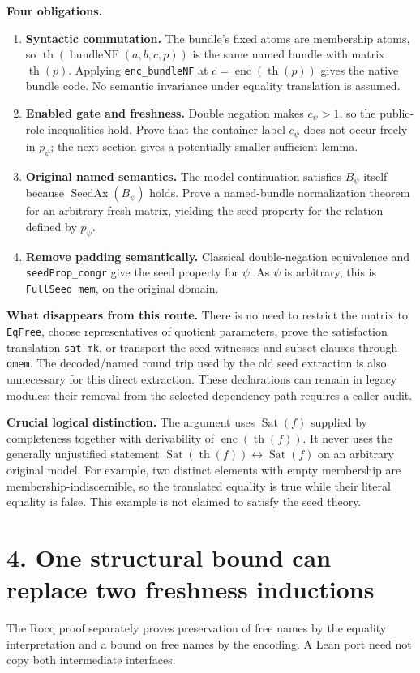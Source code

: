 \documentclass[10pt]{article}
\newcommand{\code}[1]{\texttt{#1}}
\begin{document}
\textbf{Four obligations.}
\begin{enumerate}
\item \textbf{Syntactic commutation.} The bundle's fixed atoms are membership atoms, so
$\operatorname{th}(\operatorname{bundleNF}(a,b,c,p))$
is the same named bundle with matrix $\operatorname{th}(p)$.
Applying \code{enc\_bundleNF} at $c=\operatorname{enc}(\operatorname{th}(p))$ gives the native bundle code. No semantic invariance under equality translation is assumed.
\item \textbf{Enabled gate and freshness.} Double negation makes $c_\psi>1$, so the public-role inequalities hold. Prove that the container label $c_\psi$ does not occur freely in $p_\psi$; the next section gives a potentially smaller sufficient lemma.
\item \textbf{Original named semantics.} The model continuation satisfies $B_\psi$ itself because $\operatorname{SeedAx}(B_\psi)$ holds. Prove a named-bundle normalization theorem for an arbitrary fresh matrix, yielding the seed property for the relation defined by $p_\psi$.
\item \textbf{Remove padding semantically.} Classical double-negation equivalence and \code{seedProp\_congr} give the seed property for $\psi$. As $\psi$ is arbitrary, this is \code{FullSeed mem}, on the original domain.
\end{enumerate}

\textbf{What disappears from this route.} There is no need to restrict the matrix to \code{EqFree}, choose representatives of quotient parameters, prove the satisfaction translation \code{sat\_mk}, or transport the seed witnesses and subset clauses through \code{qmem}. The decoded/named round trip used by the old seed extraction is also unnecessary for this direct extraction. These declarations can remain in legacy modules; their removal from the selected dependency path requires a caller audit.

\textbf{Crucial logical distinction.} The argument uses
$\operatorname{Sat}(f)$ supplied by completeness together with derivability of
$\operatorname{enc}(\operatorname{th}(f))$. It never uses the generally unjustified statement
$\operatorname{Sat}(\operatorname{th}(f))\leftrightarrow\operatorname{Sat}(f)$ on an arbitrary original model. For example, two distinct elements with empty membership are membership-indiscernible, so the translated equality is true while their literal equality is false. This example is not claimed to satisfy the seed theory.
\newpage
\section*{4. One structural bound can replace two freshness inductions}
The Rocq proof separately proves preservation of free names by the equality interpretation and a bound on free names by the encoding. A Lean port need not copy both intermediate interfaces.
\end{document}
